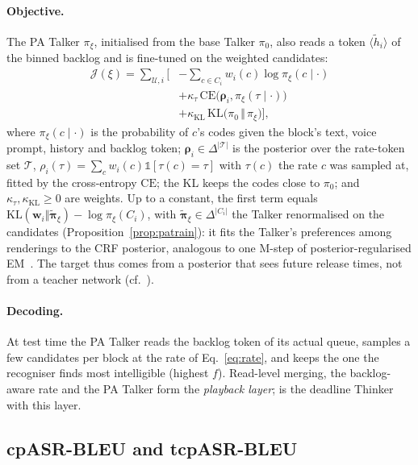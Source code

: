 \paragraph{Objective.} The PA Talker $\pi_\xi$, initialised from the base Talker $\pi_0$, also reads a token
$\langle\tilde h_i\rangle$ of the binned backlog and is fine-tuned on the weighted candidates:
\begin{equation}
\begin{aligned}
\mathcal{J}(\xi)=\textstyle\sum_{\mathcal{U},i}\Big[&-\textstyle\sum_{c\in C_i}w_i(c)\log\pi_\xi(c\mid\cdot)\\
&+\kappa_\tau\,\mathrm{CE}\big(\bm{\rho}_i,\pi_\xi(\tau\mid\cdot)\big)\\
&+\kappa_{\mathrm{KL}}\,\mathrm{KL}\big(\pi_0\,\Vert\,\pi_\xi\big)\Big],
\end{aligned}
\label{eq:patrain}
\end{equation}
where $\pi_\xi(c\mid\cdot)$ is the probability of $c$'s codes given the block's text, voice prompt, history and backlog
token; $\bm{\rho}_i\in\Delta^{|\mathcal{T}|}$ is the posterior over the rate-token set $\mathcal{T}$,
$\rho_i(\tau)=\sum_cw_i(c)\mathds{1}[\tau(c)=\tau]$ with $\tau(c)$ the rate $c$ was sampled at, fitted by the
cross-entropy $\mathrm{CE}$; the KL keeps the codes close to $\pi_0$; and $\kappa_\tau,\kappa_{\mathrm{KL}}\ge0$ are weights.
Up to a constant, the first term equals $\mathrm{KL}(\bm{w}_i\Vert\tilde{\bm{\pi}}_\xi)-\log\pi_\xi(C_i)$, with
$\tilde{\bm{\pi}}_\xi\in\Delta^{|C_i|}$ the Talker renormalised on the candidates (Proposition~\ref{prop:patrain}): it fits
the Talker's preferences among renderings to the CRF posterior, analogous to one M-step of posterior-regularised
EM~\citep{ganchev2010posterior}. The target thus comes from a posterior that sees future release times, not from a
teacher network (cf.~\citealp{hu2016harnessing}).

\paragraph{Decoding.} At test time the PA Talker reads the backlog token of its actual queue, samples a few candidates
per block at the rate of Eq.~\eqref{eq:rate}, and keeps the one the recogniser finds most intelligible (highest $f$).
Read-level merging, the backlog-aware rate and the PA Talker form the \emph{playback layer}; \sys{} is the deadline
Thinker with this layer.

\subsection{cpASR-BLEU and tcpASR-BLEU}
\label{sec:method-metrics}

